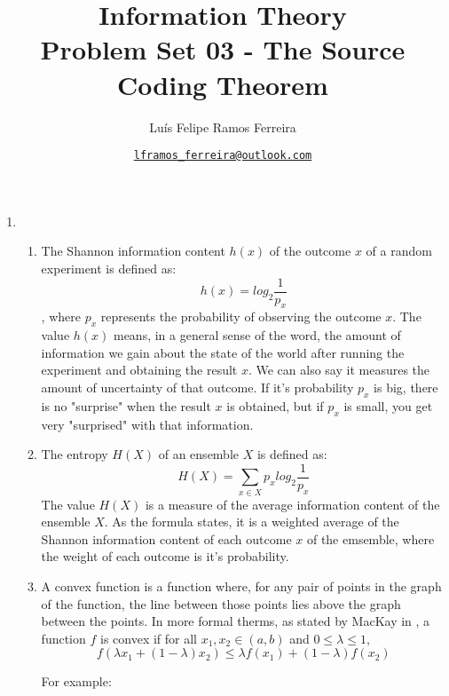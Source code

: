 \documentclass{article}
\title{Information Theory \\ \large Problem Set 03 - The Source Coding Theorem}
\author{Luís Felipe Ramos Ferreira}
\date{\href{mailto:lframos\_ferreira@outlook.com}{\texttt{lframos\_ferreira@outlook.com}}
}
\begin{document}
\maketitle

\begin{enumerate}
<<<<<<< HEAD

	\item \begin{enumerate}
		      \item The Shannon information content \(h(x)\) of the outcome \(x\) of a random experiment is defined as:
		            \[ h(x) = log_2 \frac{1}{p_x}\],
		            where \(p_x\) represents the probability of observing the outcome \(x\). The value \(h(x)\) means, in a general sense of the word, the amount of information we gain about the state of the world after running the experiment and obtaining the result \(x\). We can also say it measures the amount of uncertainty of that outcome. If it's probability \(p_x\) is big, there is no "surprise" when the result \(x\) is obtained, but if \(p_x\) is small, you get very "surprised" with that information.
		      \item The entropy \(H(X)\) of an ensemble \(X\) is defined as:
		            \[H(X) = \sum_{x \in X} p_x log_2 \frac{1}{p_x}\]
		            The value \(H(X)\) is a measure of the average information content of the ensemble \(X\). As the formula states, it is a weighted average of the Shannon information content of each outcome \(x\) of the emsemble, where the weight of each outcome is it's probability.
		      \item A convex function is a function where, for any pair of points in the graph of the function, the line between those points lies above the graph between the points. In more formal therms, as stated by MacKay in \cite{MacKay}, a function \(f\) is convex if for all \(x_1, x_2 \in (a, b)\) and \(0 \leq \lambda \leq 1\),
		            \[f(\lambda x_1 + (1 - \lambda)x_2) \leq \lambda f(x_1) + (1 - \lambda) f(x_2)\]

		            For example:


\end{enumerate}
\end{enumerate}
\end{document}
